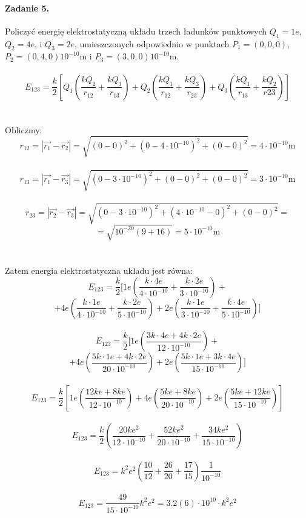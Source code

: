 \documentclass[14pt, table]{extarticle}
\begin{document}
\paragraph{Zadanie 5.}
Policzyć energię elektrostatyczną układu trzech ładunków punktowych $Q_1 = 1e$,
$Q_2 = 4e$, i $Q_3 = 2e$, umieszczonych odpowiednio w punktach $P_1 = (0, 0, 0)$, $P_2 =
(0, 4, 0) 10^{-10}$m i $P_3 = (3, 0, 0) 10^{-10}$m.
\\ \\
$$ E_{123} = \frac{k}{2} \left[ Q_1\left( \frac{kQ_2}{r_{12}} + \frac{kQ_3}{r_{13}} \right) + Q_2\left( \frac{kQ_1}{r_{12}} + \frac{kQ_3}{r_{23}} \right) + Q_3\left( \frac{kQ_1}{r_{13}} + \frac{kQ_2}{r{23}} \right) \right] $$
\\ \\
Obliczmy:
$$ r_{12} = \left| \vec{r_1} - \vec{r_2} \right| = \sqrt{\left( 0 - 0 \right)^2 + \left( 0 - 4 \cdot 10^{-10} \right)^2 + \left( 0 - 0 \right)^2} = 4 \cdot 10^{-10} \textrm{m} $$ \\
$$ r_{13} = \left| \vec{r_1} - \vec{r_3} \right| = \sqrt{\left( 0 - 3 \cdot 10^{-10} \right)^2 + \left( 0 - 0 \right)^2 + \left( 0 - 0 \right)^2} = 3 \cdot 10^{-10} \textrm{m} $$ \\
$$ r_{23} = \left| \vec{r_2} - \vec{r_3} \right| = \sqrt{\left( 0 - 3 \cdot 10^{-10} \right)^2 + \left(4 \cdot 10^{-10} - 0 \right)^2 + \left( 0 - 0 \right)^2} = $$
$$ = \sqrt{10^{-20} \left( 9 + 16 \right) } = 5 \cdot 10^{-10} \textrm{m} $$
\\ \\
Zatem energia elektrostatyczna układu jest równa:
$$ E_{123} = \frac{k}{2} \Biggl[ 1e \left( \frac{k\cdot 4e }{ 4 \cdot 10^{-10} } + \frac{k\cdot 2e }{ 3 \cdot 10^{-10} } \right) + $$
$$ + 4e \left( \frac{k \cdot 1e }{ 4 \cdot 10^{-10} } + \frac{k\cdot 2e }{ 5 \cdot 10^{-10} } \right) + 2e \left( \frac{k\cdot 1e }{ 3 \cdot 10^{-10} } + \frac{k\cdot 4e}{ 5 \cdot 10^{-10} } \right) \Biggr] $$ \\ 
$$ E_{123} = \frac{k}{2} \Biggl[ 1e \left( \frac{3 k\cdot 4e + 4 k\cdot 2e}{ 12 \cdot 10^{-10} } \right) + $$
$$ + 4e \left( \frac{5k \cdot 1e + 4k\cdot 2e }{ 20 \cdot 10^{-10} } \right) + 2e \left( \frac{5k\cdot 1e + 3k\cdot 4e}{ 15 \cdot 10^{-10} } \right) \Biggr] $$ \\ 
\newpage
$$ E_{123} = \frac{k}{2} \left[ 1e \left( \frac{12ke + 8ke}{ 12 \cdot 10^{-10} } \right) + 4e \left( \frac{5ke + 8ke}{ 20 \cdot 10^{-10} } \right) + 2e \left( \frac{5ke + 12ke}{ 15 \cdot 10^{-10} } \right) \right] $$ \\ 
$$ E_{123} = \frac{k}{2} \left( \frac{20ke^2}{ 12 \cdot 10^{-10} } + \frac{52ke^2}{ 20 \cdot 10^{-10} }  + \frac{34ke^2}{ 15 \cdot 10^{-10} } \right) $$ \\ 
$$ E_{123} = k^2e^2 \left( \frac{10}{12} + \frac{26}{20}  + \frac{17}{15} \right) \frac{1}{10^{-10}} $$ \\ 
$$ E_{123} = \frac{49}{15 \cdot 10^{-10}} k^2e^2 = 3.2(6) \cdot 10^{10} \cdot k^2e^2 $$
\end{document}
